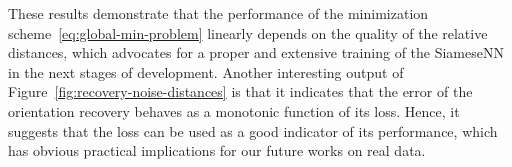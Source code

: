 These results demonstrate that the performance of the minimization scheme~\eqref{eq:global-min-problem} linearly depends on the quality of the relative distances, which advocates for a proper and extensive training of the SiameseNN in the next stages of development. Another interesting output of Figure~\ref{fig:recovery-noise-distances} is that it indicates that the error of the orientation recovery behaves as a monotonic function of its loss. Hence, it suggests that the loss can be used as a good indicator of its performance, which has obvious practical implications for our future works on real data.
